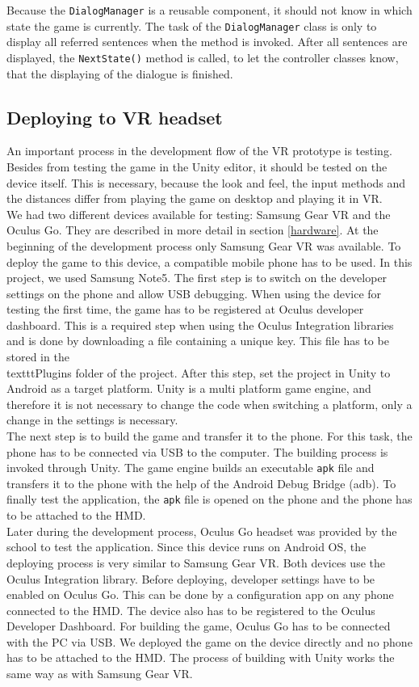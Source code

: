 Because the \texttt{DialogManager} is a reusable component, it should not know in which state the game is currently. The task of the \texttt{DialogManager} class is only to display all referred sentences when the method is invoked. After all sentences are displayed, the \texttt{NextState()} method is called, to let the controller classes know, that the displaying of the dialogue is finished. 

\newpage
\subsection{Deploying to VR headset}
An important process in the development flow of the VR prototype is testing. Besides from testing the game in the Unity editor, it should be tested on the device itself. This is necessary, because the look and feel, the input methods and the distances differ from playing the game on desktop and playing it in VR.\\
We had two different devices available for testing: Samsung Gear VR and the Oculus Go. They are described in more detail in section \ref{hardware}. At the beginning of the development process only Samsung Gear VR was available. To deploy the game to this device, a compatible mobile phone has to be used. In this project, we used Samsung Note5. The first step is to switch on the developer settings on the phone and allow USB debugging. When using the device for testing the first time, the game has to be registered at Oculus developer dashboard. This is a required step when using the Oculus Integration libraries and is done by downloading a file containing a unique key. This file has to be stored in the \\texttt{Plugins} folder of the project.
After this step, set the project in Unity to Android as a target platform. Unity is a multi platform game engine, and therefore it is not necessary to change the code when switching a platform, only a change in the settings is necessary.\\
The next step is to build the game and transfer it to the phone. For this task, the phone has to be connected via USB to the computer. The building process is invoked through Unity. The game engine builds an executable \texttt{apk} file and transfers it to the phone with the help of the Android Debug Bridge (adb). To finally test the application, the \texttt{apk} file is opened on the phone and the phone has to be attached to the HMD.\\
Later during the development process, Oculus Go headset was provided by the school to test the application. Since this device runs on Android OS, the deploying process is very similar to Samsung Gear VR. Both devices use the Oculus Integration library. Before deploying, developer settings have to be enabled on Oculus Go. This can be done by a configuration app on any phone connected to the HMD. The device also has to be registered to the Oculus Developer Dashboard. For building the game, Oculus Go has to be connected with the PC via USB. We deployed the game on the device directly and no phone has to be attached to the HMD. The process of building with Unity works the same way as with Samsung Gear VR.\\
